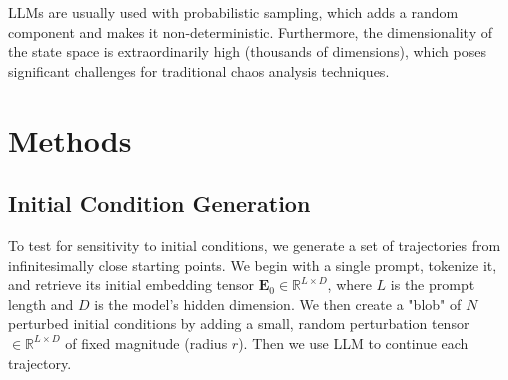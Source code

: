 \documentclass[a4paper,12pt]{article}
\begin{document}
LLMs are usually used with probabilistic sampling, which adds a random component and makes it non-deterministic. Furthermore, the dimensionality of the state space is extraordinarily high (thousands of dimensions), which poses significant challenges for traditional chaos analysis techniques.




\section{Methods}

\subsection{Initial Condition Generation}
To test for sensitivity to initial conditions, we generate a set of trajectories from infinitesimally close starting points. We begin with a single prompt, tokenize it, and retrieve its initial embedding tensor $\mathbf{E}_0 \in \mathbb{R}^{L \times D}$, where $L$ is the prompt length and $D$ is the model's hidden dimension. We then create a "blob" of $N$ perturbed initial conditions by adding a small, random perturbation tensor $\in \mathbb{R}^{L \times D}$ of fixed magnitude (radius $r$). Then we use LLM to continue each trajectory.
\end{document}
